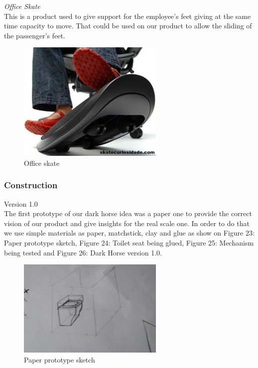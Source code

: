 \noindent\emph{Office Skate}\\ This is a product used to give support for the employee’s feet giving at the same time capacity to move. That could be used on our product to allow the sliding of the passenger’s feet.\\

\begin{figure}[h]
\centering
\includegraphics[width=7cm]{brazil_images/image024.jpg}
\caption{Office skate}%
\label{fig:office_skate}
\end{figure}


\subsubsection{Construction}
Version 1.0 \\

The first prototype of our dark horse idea was a paper one to provide the correct vision of our product and give insights for the real scale one. In order to do that we use simple materials as paper, matchstick, clay and glue as show on Figure 23: Paper prototype sketch, Figure 24: Toilet seat being glued, Figure 25: Mechanism being tested and Figure 26: Dark Horse version 1.0.\\

\begin{figure}[h]
\centering
\includegraphics[width=7cm]{brazil_images/image025.jpg}
\caption{Paper prototype sketch}
\label{fig:paper_prototype}
\end{figure}


